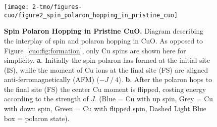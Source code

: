\begin{figure}
    \centering
    \texttt{[image: 2-tmo/figures-cuo/figure2\_spin\_polaron\_hopping\_in\_pristine\_cuo]}
    \caption{\textbf{Spin Polaron Hopping in Pristine CuO.} Diagram describing the interplay of spin and polaron hopping in CuO. As opposed to Figure~\ref{cuo:fig:formation}, only Cu spins are shown here for simplicity.
    \textbf{a}. Initially the spin polaron has formed at the initial site (IS), while the moment of Cu ions at the final site (FS) are aligned anti-ferromagnetically (AFM) ($-J⁄4$).
    \textbf{b}. After the polaron hops to the final site (FS) the center Cu moment is flipped, costing energy according to the strength of $J$. (Blue = Cu with up spin, Grey = Cu with down spin, Green = Cu with flipped spin, Dashed Light Blue box = polaron state).
    }
    \label{cuo:fig:hopprist}
\end{figure}

